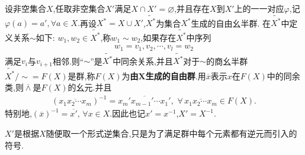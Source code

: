 \documentclass[../../main.tex]{subfiles}%
\begin{document}
\begin{theorem}\label{theorem:抽象代数--定理4.8.2}
设非空集合$X$,任取非空集合$X'$满足$X\cap X'=\varnothing$,并且存在$X$到$X'$上的一一对应$\varphi$,记$\varphi(a)=a',\forall a\in X.$再设$X^*=X\cup X'$,$\widetilde{X^*}$为集合$X^*$生成的自由幺半群. 在$\widetilde{X^*}$中定义关系$\sim$如下: $w_1,w_2\in \widetilde{X^*}$,称$w_1\sim w_2$,如果存在$\widetilde{X^*}$中序列
\begin{align*}
w_1 = v_1, v_2, \cdots, v_l = w_2
\end{align*}
满足$v_i$与$v_{i+1}$相邻.则“$\sim$”是$\widetilde{X^*}$中同余关系,并且$\widetilde{X^*}$对于$\sim$的商幺半群$\widetilde{X^*}/\sim = F(X)$是群,称$ F(X)$为\textbf{由$\boldsymbol{X}$生成的自由群}.用$\overline{x}$表示$x$在$F(X)$中的同余类,则$\overline{\land}$是$F(X)$的幺元.并且
\begin{align*}
(\overline{x_1x_2\cdots x_m})^{-1}=\overline{x_m' x_{m-1}' \cdots x_1' },\,\,\forall \,\overline{x_1x_2\cdots x_m}\in F(X).
\end{align*}
特别地,$(\overline{x})^{-1}=\overline{x'},\,\forall x\in X$.因此也记$x'=x^{-1}$,$X'=X^{-1}.$
\end{theorem}
\begin{remark}
$X'$是根据$X$随便取一个形式逆集合,只是为了满足群中每个元素都有逆元而引入的符号.
\end{remark}
\end{document}
